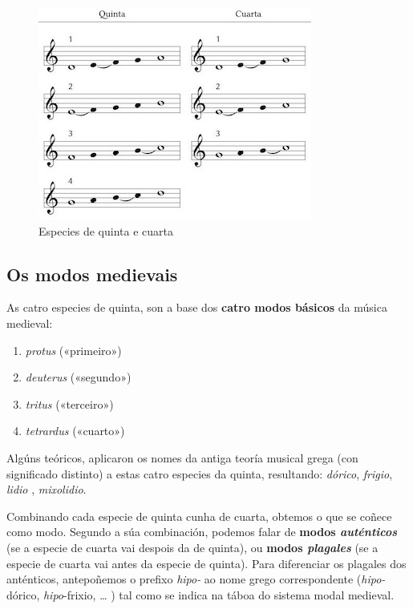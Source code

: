 \documentclass[a4paper, twoside]{templates/ociamthesis}
\providecommand{\tightlist}{%
  \setlength{\itemsep}{0pt}\setlength{\parskip}{0pt}}
\begin{document}
\begin{figure}
\centering
\includegraphics{figures/ud-03/especies.jpg}
\caption{Especies de quinta e cuarta}
\end{figure}

\hypertarget{os-modos-medievais}{%
\subsection{Os modos medievais}\label{os-modos-medievais}}

As catro especies de quinta, son a base dos \textbf{catro modos básicos} da música medieval:

\begin{enumerate}
\def\labelenumi{\arabic{enumi}.}
\tightlist
\item
  \emph{protus} («primeiro»)
\item
  \emph{deuterus} («segundo»)
\item
  \emph{tritus} («terceiro»)
\item
  \emph{tetrardus} («cuarto»)
\end{enumerate}

Algúns teóricos, aplicaron os nomes da antiga teoría musical grega (con significado distinto) a estas catro especies da quinta, resultando: \emph{dórico}, \emph{frigio}, \emph{lidio} , \emph{mixolidio}.

Combinando cada especie de quinta cunha de cuarta, obtemos o que se coñece como modo. Segundo a súa combinación, podemos falar de \textbf{modos \emph{auténticos}} (se a especie de cuarta vai despois da de quinta), ou \textbf{modos \emph{plagales}} (se a especie de cuarta vai antes da especie de quinta). Para diferenciar os plagales dos anténticos, antepoñemos o prefixo \emph{hipo-} ao nome grego correspondente (\emph{hipo-}dórico, \emph{hipo}-frixio, \ldots{} ) tal como se indica na táboa do sistema modal medieval.
\end{document}
